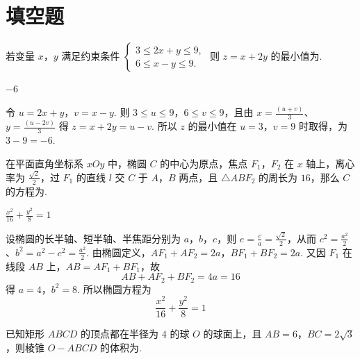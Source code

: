 \section{填空题}

\begin{problem}
若变量 \(x\)，\(y\) 满足约束条件 \(\begin{cases}
3 \leqslant 2x + y \leqslant 9,\\
6 \leqslant x - y \leqslant 9.
\end{cases}\) 则 \(z = x + 2y\) 的最小值为\fillinblank{}.
\end{problem}

\begin{answer}
\(-6\)
\end{answer}

\begin{solution}
令
\(u=2x+y\)，\(v=x-y\).
则 \(3\leqslant u\leqslant9\)，\(6\leqslant v\leqslant9\)，且由 \(x=\frac{(u+v)}{3}\)、\(y=\frac{(u-2v)}{3}\) 得
\(z=x+2y=u-v\).
所以 \(z\) 的最小值在 \(u=3\)，\(v=9\) 时取得，为 \(3-9=-6\).
\end{solution}

\begin{problem}
在平面直角坐标系 \(xOy\) 中，椭圆 \(C\) 的中心为原点，焦点 \(F_{1}\)，\(F_{2}\) 在 \(x\) 轴上，离心率为 \(\frac{\sqrt{2}}{2}\)，过 \(F_{1}\) 的直线 \(l\) 交 \(C\) 于 \(A\)，\(B\) 两点，且 \(\triangle ABF_{2}\) 的周长为 \(16\)，那么 \(C\) 的方程为\fillinblank{}.
\end{problem}

\begin{answer}
\(\frac{x^{2}}{16} + \frac{y^{2}}{8} = 1\)
\end{answer}

\begin{solution}
设椭圆的长半轴、短半轴、半焦距分别为 \(a\)，\(b\)，\(c\)，则 \(e=\frac{c}{a}=\frac{\sqrt2}{2}\)，从而 \(c^{2}=\frac{a^{2}}{2}\)、\(b^{2}=a^{2}-c^{2}=\frac{a^{2}}{2}\). 由椭圆定义，\(AF_{1}+AF_{2}=2a\)，\(BF_{1}+BF_{2}=2a\). 又因 \(F_{1}\) 在线段 \(AB\) 上，\(AB=AF_{1}+BF_{1}\)，故
\[
AB+AF_{2}+BF_{2}=4a=16
\]
得 \(a=4\)，\(b^{2}=8\). 所以椭圆方程为
\[
\frac{x^{2}}{16}+\frac{y^{2}}8=1
\]
\end{solution}

\begin{problem}
已知矩形 \(ABCD\) 的顶点都在半径为 \(4\) 的球 \(O\) 的球面上，且 \(AB = 6\)，\(BC = 2\sqrt{3}\)，则棱锥 \(O - ABCD\) 的体积为\fillinblank{}.
\end{problem}

